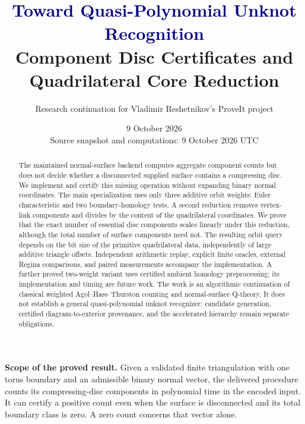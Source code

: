 \documentclass[11pt,a4paper]{article}
\title{\textcolor{navy}{Toward Quasi-Polynomial Unknot Recognition}\\[5pt]
  \large Component Disc Certificates and Quadrilateral Core Reduction}
\author{Research continuation for Vladimir Reshetnikov's ProveIt project}
\date{9 October 2026\\\small Source snapshot and computations: 9 October 2026 UTC}
\theoremstyle{definition}
\theoremstyle{remark}
\begin{document}
\maketitle
\begin{abstract}
The maintained normal-surface backend computes aggregate component counts but
does not decide whether a disconnected supplied surface contains a compressing
disc. We implement and certify this missing operation without expanding binary
normal coordinates. The main specialization uses only three additive orbit
weights: Euler characteristic and two boundary-homology tests. A second
reduction removes vertex-link components and divides by the content of the
quadrilateral coordinates. We prove that the exact number of essential disc
components scales linearly under this reduction, although the total number of
surface components need not. The resulting orbit query depends on the bit size
of the primitive quadrilateral data, independently of large additive triangle
offsets. Independent arithmetic replay, explicit finite oracles, external
Regina comparisons, and paired measurements accompany the implementation.
A further proved two-weight variant uses certified ambient homology
preprocessing; its implementation and timing are future work.
The work is an algorithmic continuation of classical weighted
Agol--Hass--Thurston counting and normal-surface Q-theory. It does not establish
a general quasi-polynomial unknot recognizer: candidate generation, certified
diagram-to-exterior provenance, and the accelerated hierarchy remain separate
obligations.
\end{abstract}
\vspace{3pt}
\begin{resultbox}
\textbf{Scope of the proved result.}
Given a validated finite triangulation with one torus boundary and an admissible
binary normal vector, the delivered procedure counts its compressing-disc
components in polynomial time in the encoded input. It can certify a positive
count even when the surface is disconnected and its total boundary class is
zero. A zero count concerns that vector alone.
\end{resultbox}
{\small\tableofcontents}
\clearpage









\end{document}
